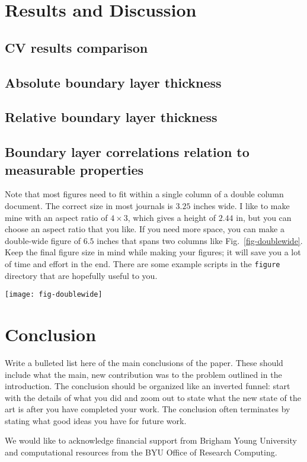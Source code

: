 \documentclass[journal=mamobx, layout=twocolumn]{achemso}
\begin{document}

\section{Results and Discussion}
\subsection{CV results comparison}
\subsection{Absolute boundary layer thickness}
\subsection{Relative boundary layer thickness}
\subsection{Boundary layer correlations relation to measurable properties}


Note that most figures need to fit within a single column of a double column document.
The correct size in most journals is $3.25$ inches wide.
I like to make mine with an aspect ratio of $4\times3$, which gives a height of $2.44$ in, but you can choose an aspect ratio that you like.
If you need more space, you can make a double-wide figure of $6.5$ inches that spans two columns like Fig.~\ref{fig-doublewide}.
Keep the final figure size in mind while making your figures; it will save you a lot of time and effort in the end.
There are some example scripts in the \texttt{figure} directory that are hopefully useful to you.

\begin{figure*}[tbp]
  \texttt{[image: fig-doublewide]}
  \caption{This is a doublewide figure (spans both columns).}
  \label{fig-doublewide}
\end{figure*}


\section{Conclusion}
Write a bulleted list here of the main conclusions of the paper.
These should include what the main, new contribution was to the problem outlined in the introduction.
The conclusion should be organized like an inverted funnel: start with the details of what you did and zoom out to state what the new state of the art is after you have completed your work.
The conclusion often terminates by stating what good ideas you have for future work.

\begin{acknowledgement}
We would like to acknowledge financial support from Brigham Young University and computational resources from the BYU Office of Research Computing.
\end{acknowledgement}

\clearpage

\end{document}
